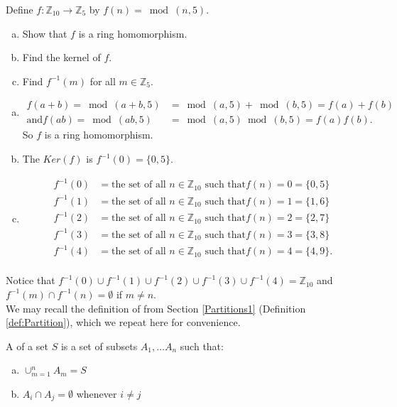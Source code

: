\begin{example}{}
Define $f: {\mathbb Z}_{10}\rightarrow {\mathbb Z}_5$ by $f(n)=\bmod(n,5)$.
\begin{enumerate}[(a)]
\item Show that $f$ is a ring homomorphism.
\item Find the kernel of $f$.
\item Find $f^{-1}(m)$ for all $m\in{\mathbb Z}_5$.
\end{enumerate}

\begin{enumerate}[(a)]
\item 
\begin{align*}
f(a+b)=\bmod(a+b,5)&=\bmod(a,5)+\bmod(b,5)=f(a)+f(b) \\
\text{and} f(ab)=\bmod(ab,5)&=\bmod(a,5)\bmod(b,5)=f(a)f(b).
\end{align*}
So $f$ is a ring homomorphism.

\item The $Ker(f)$ is $f^{-1}(0)=\{0,5\}$.\\

\item
\begin{align*}
f^{-1}(0)&=\text{the set of all $n\in{\mathbb Z}_{10}$ such that} f(n)=0=\{0,5\} \\
f^{-1}(1)&=\text{the set of all $n\in{\mathbb Z}_{10}$ such that} f(n)=1=\{1,6\} \\
f^{-1}(2)&=\text{the set of all $n\in{\mathbb Z}_{10}$ such that} f(n)=2=\{2,7\} \\
f^{-1}(3)&=\text{the set of all $n\in{\mathbb Z}_{10}$ such that} f(n)=3=\{3,8\} \\
f^{-1}(4)&=\text{the set of all $n\in{\mathbb Z}_{10}$ such that} f(n)=4=\{4,9\}. \\
\end{align*}
\end{enumerate}

Notice that $f^{-1}(0)\cup f^{-1}(1)\cup f^{-1}(2)\cup f^{-1}(3)\cup f^{-1}(4)={\mathbb Z}_{10}$ and $f^{-1}(m)\cap f^{-1}(n)=\emptyset$ if $m\neq n$.\\
We may recall the definition of  from Section \ref{Partitions1} 
(Definition \ref{def:Partition}), which we repeat here for convenience.

\begin{defn}\label{partition}
A  of a set $S$ is a set of subsets $A_1,\dots A_n$ such that:
\begin{enumerate}[(a)]
\item $\cup_{m=1}^n A_m=S$
\item $A_i\cap A_j=\emptyset$ whenever $i\neq j$
\end{enumerate}
\end{defn}


\end{example}
